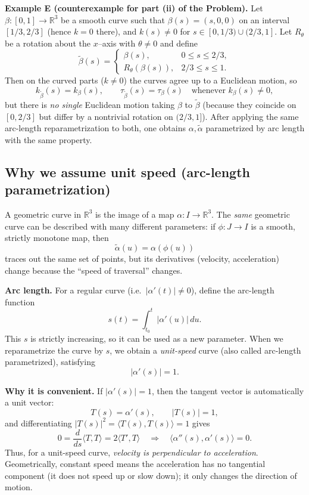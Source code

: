 \documentclass[12pt,a4paper]{article}
\theoremstyle{plain}
\theoremstyle{definition}      %
\begin{document}
\medskip
\noindent\textbf{Example E (counterexample for part (ii) of the Problem).}
Let $\beta:[0,1]\to\mathbb{R}^3$ be a smooth curve such that $\beta(s)=(s,0,0)$ on an interval
$[1/3,2/3]$ (hence $k=0$ there), and $k(s)\neq 0$ for $s\in[0,1/3)\cup(2/3,1]$.
Let $R_\theta$ be a rotation about the $x$--axis with $\theta\neq 0$ and define
\[
\widetilde\beta(s)=
\begin{cases}
	\beta(s), & 0\le s\le 2/3,\\
	R_\theta(\beta(s)), & 2/3\le s\le 1.
\end{cases}
\]
Then on the curved parts ($k\neq 0$) the curves agree up to a Euclidean motion, so
\[
k_{\widetilde\beta}(s)=k_\beta(s),\qquad \tau_{\widetilde\beta}(s)=\tau_\beta(s)\quad
\text{whenever }k_\beta(s)\neq 0,
\]
but there is \emph{no single} Euclidean motion taking $\beta$ to $\widetilde\beta$
(because they coincide on $[0,2/3]$ but differ by a nontrivial rotation on $(2/3,1]$).
After applying the same arc-length reparametrization to both, one obtains $\alpha,\widetilde\alpha$
parametrized by arc length with the same property.

\subsection*{Why we assume unit speed (arc-length parametrization)}

A geometric curve in $\mathbb{R}^3$ is the image of a map $\alpha:I\to\mathbb{R}^3$.
The \emph{same} geometric curve can be described with many different parameters:
if $\phi:J\to I$ is a smooth, strictly monotone map, then
\[
\widetilde\alpha(u)=\alpha(\phi(u))
\]
traces out the same set of points, but its derivatives (velocity, acceleration) change because the
``speed of traversal'' changes.

\medskip
\noindent\textbf{Arc length.}
For a regular curve (i.e.\ $|\alpha'(t)|\neq 0$), define the arc-length function
\[
s(t)=\int_{t_0}^{t}|\alpha'(u)|\,du.
\]
This $s$ is strictly increasing, so it can be used as a new parameter.
When we reparametrize the curve by $s$, we obtain a \emph{unit-speed} curve (also called arc-length parametrized),
satisfying
\[
|\alpha'(s)|=1.
\]

\medskip
\noindent\textbf{Why it is convenient.}
If $|\alpha'(s)|=1$, then the tangent vector is automatically a unit vector:
\[
T(s)=\alpha'(s),\qquad |T(s)|=1,
\]
and differentiating $|T(s)|^2=\langle T(s),T(s)\rangle=1$ gives
\[
0=\frac{d}{ds}\langle T,T\rangle=2\langle T',T\rangle
\quad\Longrightarrow\quad
\langle \alpha''(s),\alpha'(s)\rangle=0.
\]
Thus, for a unit-speed curve, \emph{velocity is perpendicular to acceleration}.
Geometrically, constant speed means the acceleration has no tangential component (it does not speed up or slow down);
it only changes the direction of motion.
\end{document}
